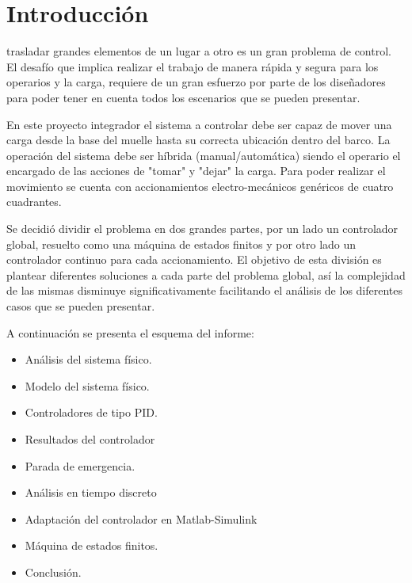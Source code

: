 \documentclass[journal]{IEEEtran}
\begin{document}
\section{Introducción}
% 
% 
% 
% 

 trasladar grandes elementos de un lugar a otro es un gran problema de 
control. El desafío que implica realizar el trabajo de manera rápida y segura
para los operarios y la carga, requiere de un gran esfuerzo por parte de los diseñadores
para poder tener en cuenta todos los escenarios que se pueden presentar.

En este proyecto integrador el sistema a controlar debe ser capaz de mover una carga
desde la base del muelle hasta su correcta ubicación dentro del barco. La operación
del sistema debe ser híbrida (manual/automática) siendo el operario el encargado de
las acciones de "tomar" y "dejar" la carga.
Para poder realizar el movimiento se cuenta con accionamientos electro-mecánicos 
genéricos de cuatro cuadrantes.

Se decidió dividir el problema en dos grandes partes, por un lado un controlador 
global, resuelto como una máquina de estados finitos y por otro lado un controlador
 continuo para cada accionamiento. El objetivo de esta división es plantear diferentes soluciones
a cada parte del problema global, así la complejidad de las mismas disminuye 
significativamente facilitando el análisis de los diferentes casos que se pueden 
presentar.

A continuación se presenta el esquema del informe:

\begin{itemize}
 \item Análisis del sistema físico.
 \item Modelo del sistema físico.
 \item Controladores de tipo PID.
 \item Resultados del controlador
 \item Parada de emergencia.
 \item Análisis en tiempo discreto
 \item Adaptación del controlador en Matlab-Simulink
 \item Máquina de estados finitos.
 \item Conclusión.
\end{itemize}
\end{document}
